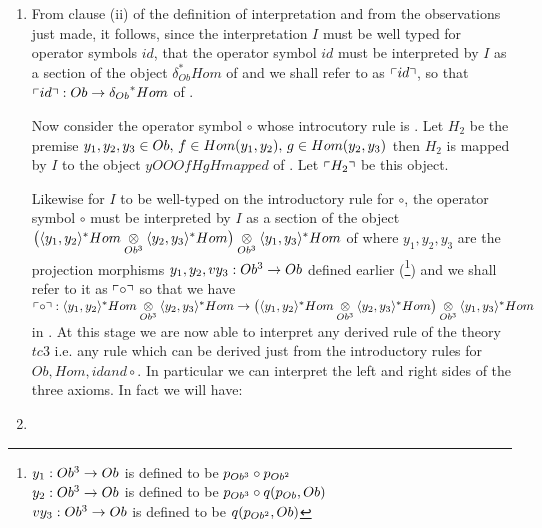 \begin{enumerate}[$tc_1$]
\item 
From clause (ii) of the definition of interpretation and from the observations just  made, it
follows, since the interpretation $I$ must be well typed for operator symbols $id$,
that the operator symbol $id$ must be interpreted by $I$ as a section of the object $\delta_{Ob}^*Hom$ of \catcw
and we shall refer to as $\left\ulcorner id\right\urcorner$, so that $\left\ulcorner id\right\urcorner : Ob \rightarrow {\delta_{Ob}}^*Hom$ of \catc. 

Now consider the operator symbol $\circ$ whose introcutory rule is
.
Let $H_2$ be the premise $y_1,y_2,y_3 \in Ob,\,f \in Hom(y_1,y_2),\,g \in Hom(y_2,y_3)$ then $H_2$ is mapped by $I$ to the object $yOOOfHgHmapped$ of \catc.
Let $\left\ulcorner H_2\right\urcorner$ be this object. 
 

Likewise for $I$ to be well-typed on the introductory rule for $\circ$, the operator symbol $\circ$ must be interpreted by $I$ as a section of the object 
$\big(\langle y_1,y_2\rangle^*Hom \underset{Ob^3}{\otimes} \langle y_2,y_3\rangle^*Hom\big) \underset{Ob^3}{\otimes} {\langle y_1,y_3\rangle^*Hom}$ of \catcw 
where $y_1,y_2,y_3$ are the projection morphisms $y_1,y_2,vy_3: Ob^3 \rightarrow Ob$ defined earlier (\tbd\footnote{
$y_1: Ob^3 \rightarrow Ob$ is defined to be $p_{Ob^3} \circ p_{Ob^2}$ \\
$y_2: Ob^3 \rightarrow Ob$ is defined to be $p_{Ob^3} \circ q(p_{Ob},Ob)$\\
$vy_3: Ob^3 \rightarrow Ob$ is defined to be $q(p_{Ob^2},Ob)$
}) and we shall refer to it as $\left\ulcorner\circ\right\urcorner$ so that we have $\left\ulcorner\circ\right\urcorner: \langle y_1,y_2\rangle^*Hom \underset{Ob^3}{\otimes} \langle y_2,y_3\rangle^*Hom \rightarrow \big(\langle y_1,y_2\rangle^*Hom \underset{Ob^3}{\otimes} \langle y_2,y_3\rangle^*Hom\big) \underset{Ob^3}{\otimes} {\langle y_1,y_3\rangle^*Hom}$ in \catc.
At this stage we are now able to interpret any derived rule of the theory $tc3$ i.e. any rule 
which can be derived just from the introductory rules for $Ob, Hom, id and \circ$. In particular we can
interpret the left and right sides of the three axioms. In fact we will have: 

 
\item %
\end{enumerate}
\fi


\newcommand{\gatinterpretationcontext}[1]{&\multicolumn{5}{p{15cm}}{#1}}

\newcommand{\compfour}{\tuple{y_1,y_2}^*Hom}
\newcommand{\compfive}{\tuple{\dot y_2,\dot y_3}^*Hom}
\newcommand{\compsix}{\tuple{\ddot y_1,\ddot y_3}^*Hom}

\newcommand{\associativitypremise}
       {\ofT{z_1,z_2,z_3,z_4}{Ob},\,
                                \ofT{f}{Hom(z_1,z_2)},\,\ofT{g}{Hom(z_2,z_3)},\,\ofT{h}{Hom(z_3,z_4)}}
																
\newcommand{\associativitypremisepoppopmapped}{\tuple{z_1,z_2}^*Hom}

